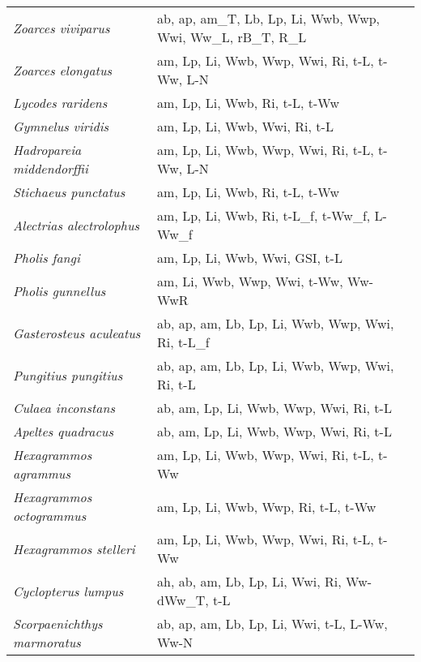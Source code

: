 {\begin{longtable}[c]{p{3.5cm}p{5.5cm}p{5.5cm}}
\emph{Zoarces viviparus} &  ab, ap, am\_T, Lb, Lp, Li, Wwb, Wwp, Wwi, Ww\_L, rB\_T, R\_L & \citet{Vete1999,Brod2001,Veer2009,Witt2009} \\
\emph{Zoarces elongatus} &  am, Lp, Li, Wwb, Wwp, Wwi, Ri, t-L, t-Ww, L-N & \citet{Poez2016} \\
\emph{Lycodes raridens} &  am, Lp, Li, Wwb, Ri, t-L, t-Ww & \citet{BalaBada2006} \\
\emph{Gymnelus viridis} &  am, Lp, Li, Wwb, Wwi, Ri, t-L & \citet{DunbGree2017} \\
\emph{Hadropareia middendorffii} &  am, Lp, Li, Wwb, Wwp, Wwi, Ri, t-L, t-Ww, L-N & \citet{Poez2016} \\
\emph{Stichaeus punctatus} &  am, Lp, Li, Wwb, Ri, t-L, t-Ww & \citet{DunbGree2017,FarwGree1976} \\
\emph{Alectrias alectrolophus} &  am, Lp, Li, Wwb, Ri, t-L\_f, t-Ww\_f, L-Ww\_f & \citet{KolpMilo2014,KolpMiro2007} \\
\emph{Pholis fangi} &  am, Lp, Li, Wwb, Wwi, GSI, t-L & \citet{HwanLee2008,VallMacL2007,Sawy1967} \\
\emph{Pholis gunnellus} &  am, Li, Wwb, Wwp, Wwi, t-Ww, Ww-WwR & \citet{Sawy1967,VallMacL2007} \\
\emph{Gasterosteus aculeatus} &  ab, ap, am, Lb, Lp, Li, Wwb, Wwp, Wwi, Ri, t-L\_f & \citet{Paep1983,WrigWoot2004,Woot1973,JoneHyne1950} \\
\emph{Pungitius pungitius} &  ab, ap, am, Lb, Lp, Li, Wwb, Wwp, Wwi, Ri, t-L & \citet{WrigWoot2004,Paep1983,JoneHyne1950} \\
\emph{Culaea inconstans} &  ab, am, Lp, Li, Wwb, Wwp, Wwi, Ri, t-L & \citet{StewReis2007,AcerLind1986} \\
\emph{Apeltes quadracus} &  ab, am, Lp, Li, Wwb, Wwp, Wwi, Ri, t-L & \citet{Schw1965,CraiFitz1982} \\
\emph{Hexagrammos agrammus} &  am, Lp, Li, Wwb, Wwp, Wwi, Ri, t-L, t-Ww & \citet{KuriSano1991} \\
\emph{Hexagrammos octogrammus} &  am, Lp, Li, Wwb, Wwp, Ri, t-L, t-Ww & \citet{ShesNaza2006} \\
\emph{Hexagrammos stelleri} &  am, Lp, Li, Wwb, Wwp, Wwi, Ri, t-L, t-Ww & \citet{ShesNaza2006} \\
\emph{Cyclopterus lumpus} &  ah, ab, am, Lb, Lp, Li, Wwi, Ri, Ww-dWw\_T, t-L & \citet{Nytr2013,Thor1983} \\
\emph{Scorpaenichthys marmoratus} &  ab, ap, am, Lb, Lp, Li, Wwi, t-L, L-Ww, Ww-N & \citet{GrebCail2010,OCon1973} \\

\end{longtable}}
